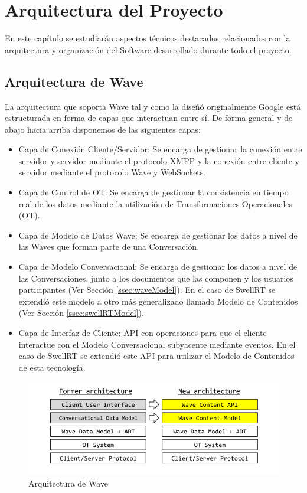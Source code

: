 \newpage
\thispagestyle{sectioned}
\chapter{Arquitectura del Proyecto}

En este capítulo se estudiarán aspectos técnicos destacados relacionados con la arquitectura y organización del Software desarrollado durante todo el proyecto.

\section{Arquitectura de Wave}

	La arquitectura que soporta Wave tal y como la diseñó originalmente Google está estructurada en forma de capas que interactuan entre sí. De forma general y de abajo hacia arriba disponemos de las siguientes capas:
	
	\begin{itemize}
		\item Capa de Conexión Cliente/Servidor: Se encarga de gestionar la conexión entre servidor y servidor mediante el protocolo XMPP y la conexión entre cliente y servidor mediante el protocolo Wave y WebSockets.
		\item Capa de Control de OT: Se encarga de gestionar la consistencia en tiempo real de los datos mediante la utilización de Transformaciones Operacionales (OT).
		\item Capa de Modelo de Datos Wave: Se encarga de gestionar los datos a nivel de las Waves que forman parte de una Conversación.
		\item Capa de Modelo Conversacional: Se encarga de gestionar los datos a nivel de las Conversaciones, junto a los documentos que las componen y los usuarios participantes (Ver Sección \ref{ssec:waveModel}). En el caso de SwellRT se extendió este modelo a otro más generalizado llamado Modelo de Contenidos (Ver Sección \ref{ssec:swellRTModel}).
		\item Capa de Interfaz de Cliente: API con operaciones para que el cliente interactue con el Modelo Conversacional subyacente mediante eventos. En el caso de SwellRT se extendió este API para utilizar el Modelo de Contenidos de esta tecnología. 
	\end{itemize}
	
	\begin{figure}[H]
	  \centering
	    \includegraphics[keepaspectratio, scale=0.6]{Media/Captures/waveArch.png}
	  \caption{Arquitectura de Wave}
	  \label{fig:waveArch}
	\end{figure}
	

